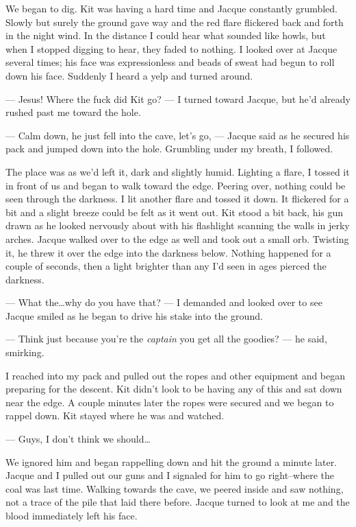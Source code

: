 We began to dig. Kit was having a hard time and Jacque constantly grumbled. Slowly but surely the ground gave way and the red flare flickered back and forth in the night wind. In the distance I could hear what sounded like howls, but when I stopped digging to hear, they faded to nothing. I looked over at Jacque several times; his face was expressionless and beads of sweat had begun to roll down his face. Suddenly I heard a yelp and turned around.

--- Jesus! Where the fuck did Kit go? --- I turned toward Jacque, but he'd already rushed past me toward the hole.

--- Calm down, he just fell into the cave, let's go, --- Jacque said as he secured his pack and jumped down into the hole. Grumbling under my breath, I followed.

The place was as we'd left it, dark and slightly humid. Lighting a flare, I tossed it in front of us and began to walk toward the edge. Peering over, nothing could be seen through the darkness. I lit another flare and tossed it down. It flickered for a bit and a slight breeze could be felt as it went out. Kit stood a bit back, his gun drawn as he looked nervously about with his flashlight scanning the walls in jerky arches. Jacque walked over to the edge as well and took out a small orb. Twisting it, he threw it over the edge into the darkness below. Nothing happened for a couple of seconds, then a light brighter than any I'd seen in ages pierced the darkness.

--- What the\ldots{}why do you have that? --- I demanded and looked over to see Jacque smiled as he began to drive his stake into the ground.

--- Think just because you're the \textit{captain} you get all the goodies? --- he said, smirking.

I reached into my pack and pulled out the ropes and other equipment and began preparing for the descent. Kit didn't look to be having any of this and sat down near the edge. A couple minutes later the ropes were secured and we began to rappel down. Kit stayed where he was and watched.

--- Guys, I don't think we should\dots 

We ignored him and began rappelling down and hit the ground a minute later. Jacque and I pulled out our guns and I signaled for him to go right--where the coal was last time. Walking towards the cave, we peered inside and saw nothing, not a trace of the pile that laid there before. Jacque turned to look at me and the blood immediately left his face. 


